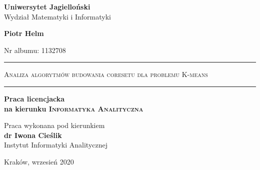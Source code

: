 \begin{titlepage}
    \begin{center}
        \LARGE
        \textbf{Uniwersytet Jagielloński}\\
        Wydział Matematyki i Informatyki
    
        \vspace{1.5in}
        \Large
        \textbf{Piotr Helm}
    
        \large
        Nr albumu: 1132708
        
        \vspace{0.5em}
        \LARGE
        \rule{\textwidth}{1pt}
        \textsc{Analiza algorytmów budowania coresetu dla problemu K-means}
        \rule{\textwidth}{1pt}
    
        \vspace{1em}
        \Large
        \textbf{Praca licencjacka}\\
        \textbf{na kierunku \textsc{Informatyka Analityczna}}
    
        \large
        \vspace{1in}
        \hfill
        \parbox{\textwidth}{
            \centering
            Praca wykonana pod kierunkiem \\
            \textbf{dr Iwona Cieślik} \\
            Instytut Informatyki Analitycznej
            }
    
        \vfill
        \Large
        Kraków, wrzesień 2020
    \end{center}
\end{titlepage}